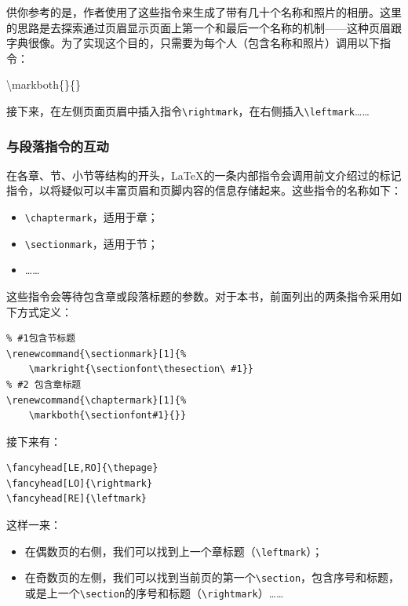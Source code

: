 \begin{ii}
    供你参考的是，作者使用了这些指令来生成了带有几十个名称和照片的相册。这里的思路是去探索通过页眉显示页面上第一个和最后一个名称的机制——这种页眉跟字典很像。为了实现这个目的，只需要为每个人（包含名称和照片）调用以下指令：
    
    \begin{dmd}
    \backslash markboth\{\}\{\}
    \end{dmd}
    
    接下来，在左侧页面页眉中插入指令\verb|\rightmark|，在右侧插入\verb|\leftmark|……
\end{ii}

\subsubsection{与段落指令的互动}

在各章、节、小节等结构的开头，\LaTeX 的一条内部指令会调用前文介绍过的标记指令，以将疑似可以丰富页眉和页脚内容的信息存储起来。这些指令的名称如下：

\begin{itemize}
    \item \verb|\chaptermark|，适用于章；
    \item \verb|\sectionmark|，适用于节；
    \item ……
\end{itemize}

这些指令会等待包含章或段落标题的参数。对于本书，前面列出的两条指令采用如下方式定义：

\begin{dmd}
\begin{verbatim}
% #1包含节标题
\renewcommand{\sectionmark}[1]{%
    \markright{\sectionfont\thesection\ #1}}
% #2 包含章标题
\renewcommand{\chaptermark}[1]{%
    \markboth{\sectionfont#1}{}}
\end{verbatim}
\end{dmd}

接下来有：

\begin{dmd}
\begin{verbatim}
\fancyhead[LE,RO]{\thepage}
\fancyhead[LO]{\rightmark}
\fancyhead[RE]{\leftmark}
\end{verbatim}
\end{dmd}

这样一来：

\begin{itemize}
    \item 在偶数页的右侧，我们可以找到上一个章标题（\verb|\leftmark|）；
    \item 在奇数页的左侧，我们可以找到当前页的第一个\verb|\section|，包含序号和标题，或是上一个\verb|\section|的序号和标题（\verb|\rightmark|）……
\end{itemize}

